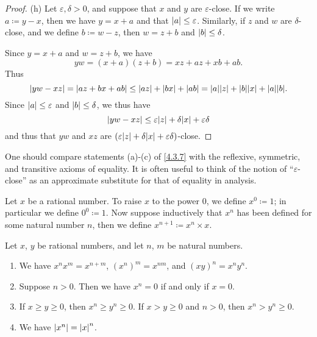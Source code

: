 \begin{proof}{(h)}
  Let \(\varepsilon, \delta > 0\), and suppose that \(x\) and \(y\) are \(\varepsilon\)-close.
  If we write \(a \coloneqq y - x\), then we have \(y = x + a\) and that \(\left\lvert a\right\rvert \leq \varepsilon\).
  Similarly, if \(z\) and \(w\) are \(\delta\)-close, and we define \(b \coloneqq w - z\), then \(w = z + b\) and \(\left\lvert b\right\rvert \leq \delta\).

  Since \(y = x + a\) and \(w = z + b\), we have
  \[
    yw = (x + a)(z + b) = xz + az + xb + ab.
  \]
  Thus
  \[
    \abs{yw - xz} = \abs{az + bx + ab} \leq \abs{az} + \abs{bx} + \abs{ab} = \abs{a}\abs{z} + \abs{b}\abs{x} + \abs{a}\abs{b}.
  \]
  Since \(\left\lvert a\right\rvert \leq \varepsilon\) and \(\left\lvert b\right\rvert \leq \delta\), we thus have
  \[
    \abs{yw - xz} \leq \varepsilon\abs{z} + \delta\abs{x} + \varepsilon\delta
  \]
  and thus that \(yw\) and \(xz\) are \((\varepsilon\abs{z} + \delta\abs{x} + \varepsilon\delta)\)-close.
\end{proof}

\begin{rmk}\label{4.3.8}
  One should compare statements (a)-(c) of \cref{4.3.7} with the reflexive, symmetric, and transitive axioms of equality.
  It is often useful to think of the notion of ``\(\varepsilon\)-close'' as an approximate substitute for that of equality in analysis.
\end{rmk}

\begin{defn}\label{4.3.9}
  Let \(x\) be a rational number.
  To raise \(x\) to the power \(0\), we define \(x^0 \coloneqq 1\);
  in particular we define \(0^0 \coloneqq 1\).
  Now suppose inductively that \(x^n\) has been defined for some natural number \(n\), then we define \(x^{n+1} \coloneqq x^n \times x\).
\end{defn}

\begin{prop}\label{4.3.10}
  Let \(x\), \(y\) be rational numbers, and let \(n\), \(m\) be natural numbers.
  \begin{enumerate}
    \item We have \(x^n x^m = x^{n + m}\), \((x^n)^m = x^{nm}\), and \((xy)^n = x^n y^n\).
    \item Suppose \(n > 0\).
          Then we have \(x^n = 0\) if and only if \(x = 0\).
    \item If \(x \geq y \geq 0\), then \(x^n \geq y^n \geq 0\).
          If \(x > y \geq 0\) and \(n > 0\), then \(x^n > y^n \geq 0\).
    \item We have \(\left\lvert x^n\right\rvert = \left\lvert x\right\rvert^n\).
  \end{enumerate}
\end{prop}

